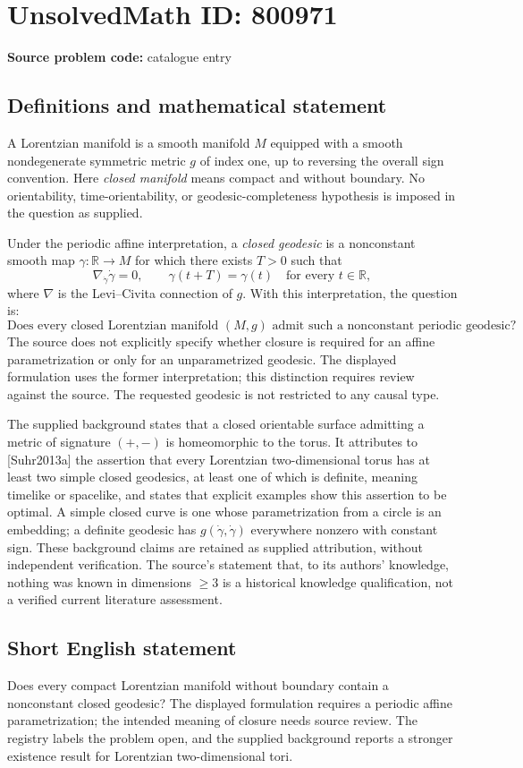 \documentclass[11pt]{article}
\newcommand{\R}{\mathbb{R}}
\begin{document}
\section*{UnsolvedMath ID: 800971}
\textbf{Source problem code:} catalogue entry
\subsection{Definitions and mathematical statement}
A Lorentzian manifold is a smooth manifold \(M\) equipped with a smooth nondegenerate symmetric metric \(g\) of index one, up to reversing the overall sign convention. Here \emph{closed manifold} means compact and without boundary. No orientability, time-orientability, or geodesic-completeness hypothesis is imposed in the question as supplied.

Under the periodic affine interpretation, a \emph{closed geodesic} is a nonconstant smooth map \(\gamma:\R\to M\) for which there exists \(T>0\) such that
\[
\nabla_{\dot\gamma}\dot\gamma=0,
\qquad
\gamma(t+T)=\gamma(t)\quad\text{for every }t\in\R,
\]
where \(\nabla\) is the Levi--Civita connection of \(g\). With this interpretation, the question is:
\[
\text{Does every closed Lorentzian manifold }(M,g)
\text{ admit such a nonconstant periodic geodesic?}
\]
The source does not explicitly specify whether closure is required for an affine parametrization or only for an unparametrized geodesic. The displayed formulation uses the former interpretation; this distinction requires review against the source. The requested geodesic is not restricted to any causal type.

The supplied background states that a closed orientable surface admitting a metric of signature \((+,-)\) is homeomorphic to the torus. It attributes to [Suhr2013a] the assertion that every Lorentzian two-dimensional torus has at least two simple closed geodesics, at least one of which is definite, meaning timelike or spacelike, and states that explicit examples show this assertion to be optimal. A simple closed curve is one whose parametrization from a circle is an embedding; a definite geodesic has \(g(\dot\gamma,\dot\gamma)\) everywhere nonzero with constant sign. These background claims are retained as supplied attribution, without independent verification. The source's statement that, to its authors' knowledge, nothing was known in dimensions \(\geq 3\) is a historical knowledge qualification, not a verified current literature assessment.
\subsection{Short English statement}
Does every compact Lorentzian manifold without boundary contain a nonconstant closed geodesic? The displayed formulation requires a periodic affine parametrization; the intended meaning of closure needs source review. The registry labels the problem open, and the supplied background reports a stronger existence result for Lorentzian two-dimensional tori.
\end{document}
